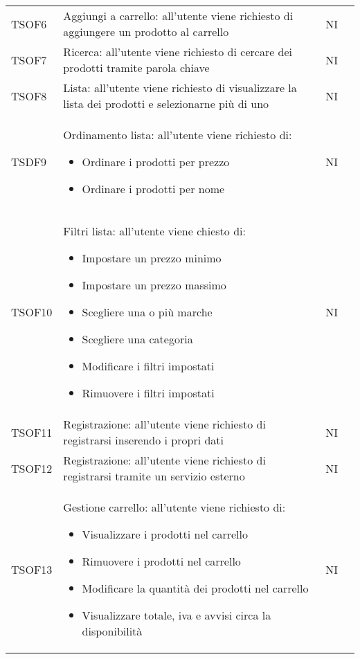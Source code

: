 \begin{center}
\begin{longtable}[!h]{p{50px} p{245px} p{75px} p{50px}}
        TSOF6                            & Aggiungi a carrello: all'utente viene richiesto di aggiungere un prodotto al carrello                                                            & NI             \\
        TSOF7                            & Ricerca: all'utente viene richiesto di cercare dei prodotti tramite parola chiave                                                                & NI             \\
        TSOF8                            & Lista: all'utente viene richiesto di visualizzare la lista dei prodotti e selezionarne pi\`u di uno                                              & NI             \\
        TSDF9                            & Ordinamento lista: all'utente viene richiesto di: \begin{itemize} \item Ordinare i prodotti per prezzo \item Ordinare i prodotti per nome \end{itemize}                                                                      & NI             \\
        TSOF10                           & Filtri lista: all'utente viene chiesto di: \begin{itemize} \item Impostare un prezzo minimo \item Impostare un prezzo massimo \item Scegliere una o pi\`u marche \item Scegliere una categoria \item Modificare i filtri impostati \item Rimuovere i filtri impostati \end{itemize}                                                                             & NI             \\
        TSOF11                           & Registrazione: all'utente viene richiesto di registrarsi inserendo i propri dati                                                                 & NI             \\
        TSOF12                           & Registrazione: all'utente viene richiesto di registrarsi tramite un servizio esterno                                                             & NI             \\
        TSOF13                           & Gestione carrello: all'utente viene richiesto di: \begin{itemize} \item Visualizzare i prodotti nel carrello \item Rimuovere i prodotti nel carrello \item Modificare la quantit\`a dei prodotti nel carrello \item Visualizzare totale, iva e avvisi circa la disponibilit\`a \end{itemize}                                                                      & NI             \\

\end{longtable}
\end{center}
